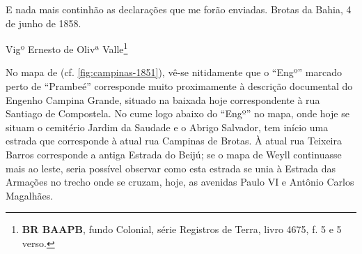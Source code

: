 \begin{citacao}
\begin{citacao}
E nada mais continhão as declarações que me forão enviadas. Brotas da Bahia, 4 de junho de 1858.

Vigº Ernesto de Olivª Valle\footnote{\textbf{BR BAAPB}, fundo Colonial, série Registros de Terra, livro 4675, f. 5 e 5 verso.}
\end{citacao}

No mapa de  (cf. \autoref{fig:campinas-1851}), vê-se nitidamente que o ``Engº'' marcado perto de ``Prambeé'' corresponde muito proximamente à descrição documental do Engenho Campina Grande, situado na baixada hoje correspondente à rua Santiago de Compostela. No cume logo abaixo do ``Engº'' no mapa, onde hoje se situam  o cemitério Jardim da Saudade e o Abrigo Salvador, tem início uma estrada que corresponde à atual rua Campinas de Brotas. À atual rua Teixeira Barros corresponde a antiga Estrada do Beijú; se o mapa de Weyll continuasse mais ao leste, seria possível observar como esta estrada se unia à Estrada das Armações no trecho onde se cruzam, hoje, as avenidas Paulo VI e Antônio Carlos Magalhães. 


\end{citacao}
